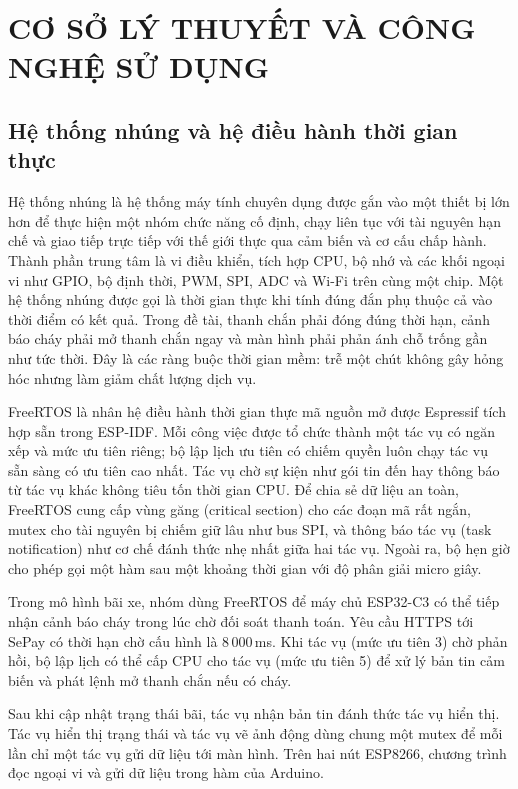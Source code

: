 \chapter{CƠ SỞ LÝ THUYẾT VÀ CÔNG NGHỆ SỬ DỤNG}\label{chap:coso}

\section{Hệ thống nhúng và hệ điều hành thời gian thực}
Hệ thống nhúng là hệ thống máy tính chuyên dụng được gắn vào một thiết bị lớn hơn để thực
hiện một nhóm chức năng cố định, chạy liên tục với tài nguyên hạn chế và giao tiếp trực tiếp
với thế giới thực qua cảm biến và cơ cấu chấp hành. Thành phần trung tâm là vi điều khiển,
tích hợp CPU, bộ nhớ và các khối ngoại vi như GPIO, bộ định thời, PWM, SPI, ADC và Wi-Fi trên
cùng một chip. Một hệ thống nhúng được gọi là thời gian thực khi tính đúng đắn phụ thuộc cả
vào thời điểm có kết quả. Trong đề tài, thanh chắn phải đóng đúng thời hạn, cảnh báo cháy
phải mở thanh chắn ngay và màn hình phải phản ánh chỗ trống gần như tức thời. Đây là các
ràng buộc thời gian mềm: trễ một chút không gây hỏng hóc nhưng làm giảm chất lượng dịch vụ.

FreeRTOS là nhân hệ điều hành thời gian thực mã nguồn mở được Espressif tích hợp sẵn trong
ESP-IDF. Mỗi công việc được tổ chức thành một tác vụ có ngăn xếp và mức ưu tiên riêng; bộ
lập lịch ưu tiên có chiếm quyền luôn chạy tác vụ sẵn sàng có ưu tiên cao nhất. Tác vụ chờ sự
kiện như gói tin đến hay thông báo từ tác vụ khác không tiêu tốn thời gian CPU. Để chia sẻ
dữ liệu an toàn, FreeRTOS cung cấp vùng găng (critical section) cho các đoạn mã rất ngắn,
mutex cho tài nguyên bị chiếm giữ lâu như bus SPI, và thông báo tác vụ (task notification)
như cơ chế đánh thức nhẹ nhất giữa hai tác vụ. Ngoài ra, bộ hẹn giờ  cho
phép gọi một hàm sau một khoảng thời gian với độ phân giải micro giây.

Trong mô hình bãi xe, nhóm dùng FreeRTOS để máy chủ ESP32-C3 có thể tiếp nhận cảnh báo cháy trong lúc chờ đối soát thanh toán. Yêu cầu HTTPS tới SePay có thời hạn chờ cấu hình là 8\,000\,ms. Khi tác vụ  (mức ưu tiên 3) chờ phản hồi, bộ lập lịch có thể cấp CPU cho tác vụ  (mức ưu tiên 5) để xử lý bản tin cảm biến và phát lệnh mở thanh chắn nếu có cháy.

Sau khi cập nhật trạng thái bãi, tác vụ nhận bản tin đánh thức tác vụ hiển thị. Tác vụ hiển thị trạng thái và tác vụ vẽ ảnh động dùng chung một mutex để mỗi lần chỉ một tác vụ gửi dữ liệu tới màn hình. Trên hai nút ESP8266, chương trình đọc ngoại vi và gửi dữ liệu trong hàm  của Arduino.

